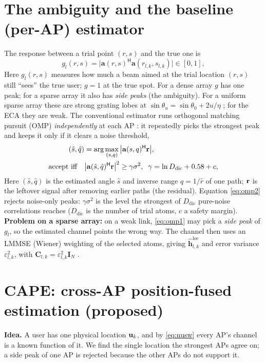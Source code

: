 \documentclass[11pt]{article}
\newcommand{\herm}{^{\mathsf{H}}}
\newcommand{\va}{\mathbf{a}}\newcommand{\vb}{\mathbf{b}}\newcommand{\vh}{\mathbf{h}}
\newcommand{\mC}{\mathbf{C}}\newcommand{\mI}{\mathbf{I}}\newcommand{\mR}{\mathbf{R}}
\begin{document}
\section{The ambiguity and the baseline (per-AP) estimator}
The response between a trial point $(r,s)$ and the true one is
\begin{equation}
g_{l}(r,s)=\big|\va(r,s)\herm\va(r_{l,k},s_{l,k})\big|\in[0,1],
\label{eq:beam}
\end{equation}
%
{Here $g_{l}(r,s)$ measures how much a beam aimed at the trial location $(r,s)$ still ``sees'' the
true user; $g=1$ at the true spot. For a dense array $g$ has one peak; for a sparse array it also has
\emph{side peaks} (the ambiguity). For a uniform sparse array these are strong grating lobes at
$\sin\theta_{u}=\sin\theta_{0}+2u/\eta$ \cite[Lemma~5]{zhou2025sparse}; for the ECA they are weak.}
The conventional estimator runs orthogonal matching pursuit (OMP) \emph{independently} at each AP
\cite{tropp2007omp,cui2022channel}: it repeatedly picks the strongest peak and keeps it only if it
clears a noise threshold,
\begin{align}
(\hat s,\hat q)&=\arg\max_{(s,q)}\big|\va(s,q)\herm\vr\big|,\label{eq:omp1}\\
\text{accept iff}\quad&\big|\va(\hat s,\hat q)\herm\vr\big|^{2}\ge\gamma\sigma^{2},\;\;
\gamma=\ln D_{\mathrm{dic}}+0.58+c,\label{eq:omp2}
\end{align}
%
{Here $(\hat s,\hat q)$ is the estimated angle $\hat s$ and inverse range $\hat q=1/\hat r$ of one
path; $\mathbf{r}$ is the leftover signal after removing earlier paths (the residual). Equation
\eqref{eq:omp2} rejects noise-only peaks: $\gamma\sigma^{2}$ is the level the strongest of
$D_{\mathrm{dic}}$ pure-noise correlations reaches ($D_{\mathrm{dic}}$ is the number of trial atoms,
$c$ a safety margin). \textbf{Problem on a sparse array:} on a weak link, \eqref{eq:omp1} may pick a
\emph{side peak} of $g_{l}$, so the estimated channel points the wrong way.}
The channel then uses an LMMSE (Wiener) weighting of the selected atoms, giving
$\hat{\vh}^{\mathrm{loc}}_{l,k}$ and error variance $\varepsilon^{2}_{l,k}$, with
$\mC_{l,k}=\varepsilon^{2}_{l,k}\mI_{N}$ \cite{cui2022channel}.

\section{CAPE: cross-AP position-fused estimation (proposed)}
\textbf{Idea.} A user has one physical location $\mathbf{u}_{k}$, and by \eqref{eq:nusw} every AP's channel
is a known function of it. We find the single location the strongest APs agree on; a side peak of one
AP is rejected because the other APs do not support it.
\end{document}
